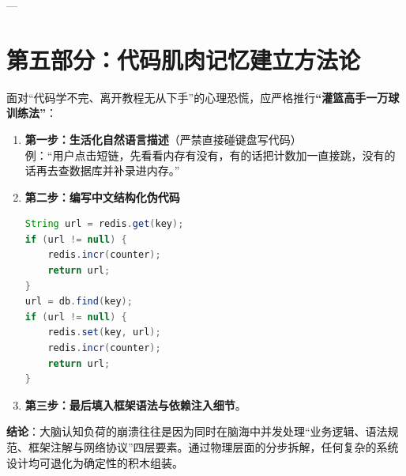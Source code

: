 \documentclass[11pt,a4paper]{ctexart}
\begin{document}
---

\section{第五部分：代码肌肉记忆建立方法论}

面对“代码学不完、离开教程无从下手”的心理恐慌，应严格推行\textbf{“灌篮高手一万球训练法”}：

\begin{tcolorbox}[colback=green!5!white,colframe=green!60!black,title=\textbf{工程师三步降维法则}]
\begin{enumerate}[leftmargin=*]
    \item \textbf{第一步：生活化自然语言描述}（严禁直接碰键盘写代码）\\
    例：“用户点击短链，先看看内存有没有，有的话把计数加一直接跳，没有的话再去查数据库并补录进内存。”
    \item \textbf{第二步：编写中文结构化伪代码}
\begin{lstlisting}[language=Java]
String url = redis.get(key);
if (url != null) {
    redis.incr(counter);
    return url;
}
url = db.find(key);
if (url != null) {
    redis.set(key, url);
    redis.incr(counter);
    return url;
}
\end{lstlisting}
    \item \textbf{第三步：最后填入框架语法与依赖注入细节}。
\end{enumerate}
\end{tcolorbox}

\textbf{结论}：大脑认知负荷的崩溃往往是因为同时在脑海中并发处理“业务逻辑、语法规范、框架注解与网络协议”四层要素。通过物理层面的分步拆解，任何复杂的系统设计均可退化为确定性的积木组装。
\end{document}
